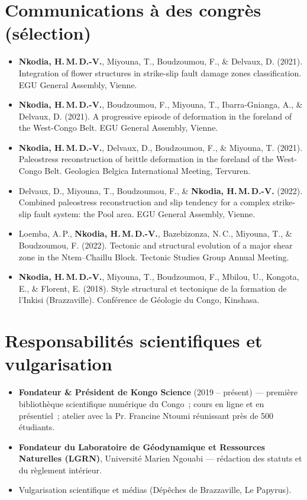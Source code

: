 \documentclass[11pt,a4paper]{article}
\begin{document}
\section{Communications à des congrès (sélection)}
\begin{itemize}\small
\item \textbf{Nkodia, H.\,M.\,D.-V.}, Miyouna, T., Boudzoumou, F., \& Delvaux, D. (2021). Integration of flower structures in strike-slip fault damage zones classification. EGU General Assembly, Vienne.
\item \textbf{Nkodia, H.\,M.\,D.-V.}, Boudzoumou, F., Miyouna, T., Ibarra-Gnianga, A., \& Delvaux, D. (2021). A progressive episode of deformation in the foreland of the West-Congo Belt. EGU General Assembly, Vienne.
\item \textbf{Nkodia, H.\,M.\,D.-V.}, Delvaux, D., Boudzoumou, F., \& Miyouna, T. (2021). Paleostress reconstruction of brittle deformation in the foreland of the West-Congo Belt. Geologica Belgica International Meeting, Tervuren.
\item Delvaux, D., Miyouna, T., Boudzoumou, F., \& \textbf{Nkodia, H.\,M.\,D.-V.} (2022). Combined paleostress reconstruction and slip tendency for a complex strike-slip fault system: the Pool area. EGU General Assembly, Vienne.
\item Loemba, A.\,P., \textbf{Nkodia, H.\,M.\,D.-V.}, Bazebizonza, N.\,C., Miyouna, T., \& Boudzoumou, F. (2022). Tectonic and structural evolution of a major shear zone in the Ntem–Chaillu Block. Tectonic Studies Group Annual Meeting.
\item \textbf{Nkodia, H.\,M.\,D.-V.}, Miyouna, T., Boudzoumou, F., Mbilou, U., Kongota, E., \& Florent, E. (2018). Style structural et tectonique de la formation de l'Inkisi (Brazzaville). Conférence de Géologie du Congo, Kinshasa.
\end{itemize}

\section{Responsabilités scientifiques et vulgarisation}
\begin{itemize}
\item \textbf{Fondateur \& Président de Kongo Science} (2019 – présent) — première bibliothèque scientifique numérique du Congo~; cours en ligne et en présentiel~; atelier avec la Pr. Francine Ntoumi réunissant près de 500 étudiants.
\item \textbf{Fondateur du Laboratoire de Géodynamique et Ressources Naturelles (LGRN)}, Université Marien Ngouabi — rédaction des statuts et du règlement intérieur.
\item Vulgarisation scientifique et médias (Dépêches de Brazzaville, Le Papyrus).
\end{itemize}
\end{document}
